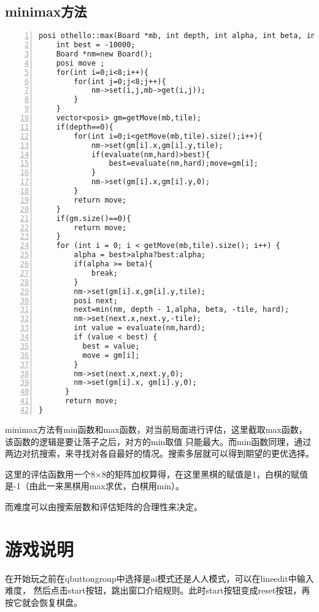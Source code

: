 \documentclass[UTF8]{ctexart}
\begin{document}
\subsection{minimax方法}
\begin{lstlisting}[language={[ANSI]C},numbers=left,numberstyle=\tiny,%frame=shadowbox,  
    rulesepcolor=\color{red!20!green!20!blue!20},  
    keywordstyle=\color{blue!70!black},  
    commentstyle=\color{blue!90!},  
    basicstyle=\ttfamily]  
posi othello::max(Board *mb, int depth, int alpha, int beta, int tile,int hard){
    int best = -10000;
    Board *nm=new Board();
    posi move ;
    for(int i=0;i<8;i++){
        for(int j=0;j<8;j++){
            nm->set(i,j,mb->get(i,j));
        }
    }
    vector<posi> gm=getMove(mb,tile);
    if(depth==0){
        for(int i=0;i<getMove(mb,tile).size();i++){
            nm->set(gm[i].x,gm[i].y,tile);
            if(evaluate(nm,hard)>best){
                best=evaluate(nm,hard);move=gm[i];
            }
            nm->set(gm[i].x,gm[i].y,0);
        }
        return move;
    }
    if(gm.size()==0){
        return move;
    }
    for (int i = 0; i < getMove(mb,tile).size(); i++) {
        alpha = best>alpha?best:alpha;
        if(alpha >= beta){
            break;
        }
        nm->set(gm[i].x,gm[i].y,tile);
        posi next;
        next=min(nm, depth - 1,alpha, beta, -tile, hard);
        nm->set(next.x,next.y,-tile);
        int value = evaluate(nm,hard);
        if (value < best) {
          best = value;
          move = gm[i];
        }
        nm->set(next.x,next.y,0);
        nm->set(gm[i].x, gm[i].y,0);
      }
      return move;
}
\end{lstlisting}


minimax方法有min函数和max函数，对当前局面进行评估，这里截取max函数，该函数的逻辑是要让落子之后，对方的min取值
只能最大。而min函数同理，通过两边对抗搜索，来寻找对各自最好的情况。搜索多层就可以得到期望的更优选择。

这里的评估函数用一个8×8的矩阵加权算得，在这里黑棋的赋值是1，白棋的赋值是-1（由此一来黑棋用max求优，白棋用min）。

而难度可以由搜索层数和评估矩阵的合理性来决定。
\section{游戏说明}


在开始玩之前在qbuttongroup中选择是ai模式还是人人模式，可以在lineedit中输入难度，
然后点击start按钮，跳出窗口介绍规则。此时start按钮变成reset按钮，再按它就会恢复棋盘。
\end{document}
